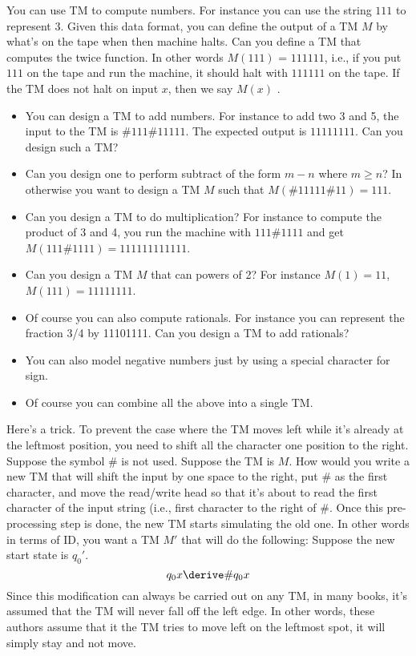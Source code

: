 \begin{eg}
You can use TM to compute numbers. For instance you can use the
string $111$ to represent $3$. Given this data format, you can
define the output of a TM $M$ by what's on the tape when then
machine halts. Can you define a TM that computes the twice
function. In other words $M(111)$ = $111111$, i.e., if you put
$111$ on the tape and run the machine, it should halt with
$111111$ on the tape. If the TM does not halt on input $x$, then
we say $M(x)$ .
\begin{itemize}
 \item You can design a
 TM to add numbers. For instance to add two 3 and 5, the input to
 the TM is $\#111\#11111$. The expected output is $11111111$. Can
 you design such a TM?
\item Can you design one to perform subtract
 of the form $m-n$ where $m\geq n$? In otherwise you want to
 design a TM $M$ such that $M(\#11111\#11) = 111$.
 \item Can you design a TM to do multiplication? For instance to
 compute the product of 3 and 4, you run the machine with
 $111\#1111$ and get $M(111\#1111) = 111111111111$.
 \item Can you design a TM $M$ that can powers of 2? For instance
 $M(1) = 11$, $M(111) = 11111111$.
 \item Of course you can also compute rationals. For instance you
 can represent the fraction 3/4 by 11101111. Can you design a TM
 to add rationals?
 \item You can also model negative numbers just by using a special
 character for sign.
 \item Of course you can combine all the above into a single TM.
\end{itemize}
\end{eg}

\begin{eg} Here's a trick. To prevent the case where the TM moves
left while it's already at the leftmost position, you need to
shift all the character one position to the right. Suppose the
symbol $\#$ is not used. Suppose the TM is $M$. How would you
write a new TM that will shift the input by one space to the
right, put $\#$ as the first character, and move the read/write
head so that it's about to read the first character of the input
string (i.e., first character to the right of $\#$. Once this
pre-processing step is done, the new TM starts simulating the old
one. In other words in terms of ID, you want a TM $M'$ that will
do the following: Suppose the new start state is $q_0'$.
\[
 q_0x \derive \#q_0x
\]
Since this modification can always be carried out on any TM, in
many books, it's assumed that the TM will never fall off the left
edge. In other words, these authors assume that it the TM tries to
move left on the leftmost spot, it will simply stay and not move.
\end{eg}

